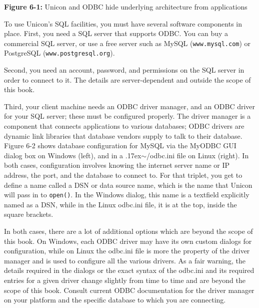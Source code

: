 {\sffamily\bfseries Figure 6-1:}
{\sffamily Unicon and ODBC hide underlying architecture from
 applications}

\bigskip

To use Unicon's SQL facilities, you must have several
software components in place. First, you need a SQL server that
supports ODBC. You can buy a commercial SQL server, or
use a free server such as MySQL
(\texttt{www.mysql.com}) or PostgreSQL
(\texttt{www.postgresql.org}).

Second, you need an account, password, and permissions on the SQL
server in order to connect to it. The details are
server-dependent and outside the scope of this book.

Third, your client machine needs an ODBC
driver manager, and an ODBC driver for your SQL server; these must
be configured properly. The driver manager is a component
that connects applications to various databases; ODBC
drivers are dynamic link libraries that database vendors supply
to talk to their database.  Figure 6-2 shows database configuration
for MySQL via the MyODBC GUI dialog box on Windows (left), and in a
{\raise.17ex\hbox{$\scriptstyle\sim$}}/odbc.ini file on Linux (right).
In both cases, configuration involves knowing the internet server
name or IP address, the port, and the database to connect to. For that
triplet, you get to define a name called a DSN or data source name,
which is the name that Unicon will pass in to \texttt{open()}. In the
Windows dialog, this name is a textfield explicitly named as a DSN,
while in the Linux odbc.ini file, it is at the top, inside the square
brackets.

In both cases, there are a lot of additional options which are beyond
the scope of this book.  On Windows, each ODBC driver may have its own
custom dialogs for configuration, while on Linux the odbc.ini file is
more the property of the driver manager and is used to configure all
the various drivers. As a fair warning, the details required in the
dialogs or the exact syntax of the odbc.ini and its required entries
for a given driver change slightly from time to time and are beyond
the scope of this book.  Consult current ODBC documentation for the
driver manager on your platform and the specific database to which
you are connecting.

\bigskip

